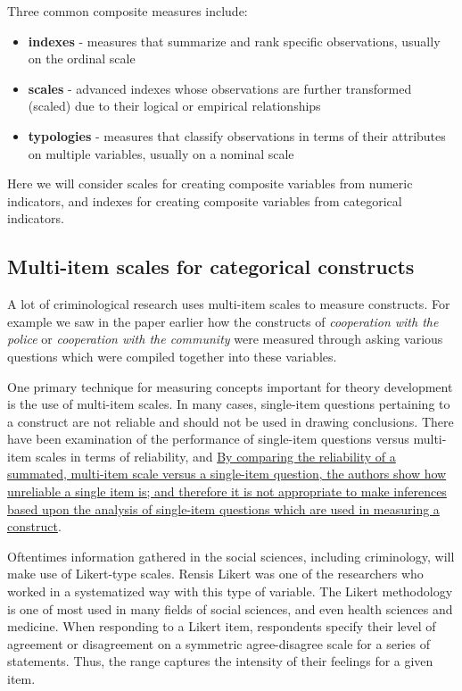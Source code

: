 \documentclass[
]{book}
\providecommand{\tightlist}{%
  \setlength{\itemsep}{0pt}\setlength{\parskip}{0pt}}
\begin{document}
Three common composite measures include:

\begin{itemize}
\tightlist
\item
  \textbf{indexes} - measures that summarize and rank specific observations, usually on the ordinal scale
\item
  \textbf{scales} - advanced indexes whose observations are further transformed (scaled) due to their logical or empirical relationships
\item
  \textbf{typologies} - measures that classify observations in terms of their attributes on multiple variables, usually on a nominal scale
\end{itemize}

Here we will consider scales for creating composite variables from numeric indicators, and indexes for creating composite variables from categorical indicators.

\hypertarget{multi-item-scales-for-categorical-constructs}{%
\subsection{Multi-item scales for categorical constructs}\label{multi-item-scales-for-categorical-constructs}}

A lot of criminological research uses multi-item scales to measure constructs. For example we saw in the paper earlier how the constructs of \emph{cooperation with the police} or \emph{cooperation with the community} were measured through asking various questions which were compiled together into these variables.

One primary technique for measuring concepts important for theory development is the use of multi-item scales. In many cases, single-item questions pertaining to a construct are not reliable and should not be used in drawing conclusions. There have been examination of the performance of single-item questions versus multi-item scales in terms of reliability, and \href{https://scholarworks.iupui.edu/handle/1805/344}{By comparing the reliability of a summated, multi-item scale versus a single-item question, the authors show how unreliable a single item is; and therefore it is not appropriate to make inferences based upon the analysis of single-item questions which are used in measuring a construct}.

Oftentimes information gathered in the social sciences, including criminology, will make use of Likert-type scales. Rensis Likert was one of the researchers who worked in a systematized way with this type of variable. The Likert methodology is one of most used in many fields of social sciences, and even health sciences and medicine. When responding to a Likert item, respondents specify their level of agreement or disagreement on a symmetric agree-disagree scale for a series of statements. Thus, the range captures the intensity of their feelings for a given item.
\end{document}
